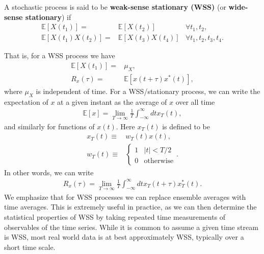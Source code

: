 A stochastic process is said to be \textbf{weak-sense stationary (WSS)} (or \textbf{wide-sense stationary}) if 
\begin{align}
    \mathbb{E}\left[X\left(t_1\right)\right]
    =&
    \mathbb{E}\left[X\left(t_2\right)\right]
    &
    \forall t_1,t_2
    ,\\
    \mathbb{E}\left[X\left(t_1\right)X\left(t_2\right)\right]
    =&
    \mathbb{E}\left[X\left(t_3\right)X\left(t_4\right)\right]
    &
    \forall t_1,t_2, t_3, t_4
    .
\end{align}

That is, for a WSS process we have
\begin{align}
    \label{eq:WSS-mean}
    \mathbb{E}\left[X\left(t_1\right)\right]
    =&
    \mu_X
    ,\\
    \label{eq:WSS-autocorrelation}
    R_x\left(\tau\right) 
    =&
    \mathbb{E}\left[x\left(t+\tau\right)x^*\left(t\right)\right]
    ,
\end{align}
where $\mu_X$ is independent of time.
For a WSS/stationary process, we can write the expectation of $x$ at a given instant as the average of $x$ over all time 
\begin{align}
    \mathbb{E}\left[x\right]
    =
    \lim_{T\to\infty}\frac{1}{T}\int_{-\infty}^{\infty}dt x_T\left(t\right)
    ,
\end{align}
and similarly for functions of $x(t)$.
Here $x_T\left(t\right)$ is defined to be
\begin{align}
    x_T\left(t\right) 
    \equiv& 
    w_T\left(t\right)x\left(t\right)
    ,\\
    w_T\left(t\right)
    \equiv&
    \begin{cases}
        1 & |t|<T/2
        \\
        0 & \mathrm{otherwise}
    \end{cases}
    .
\end{align}
In other words, we can write
\begin{align}
    \label{eq:autocorrelation-WSS-integral}
    R_x\left(\tau\right)
    =
    \lim_{T\to\infty}\frac{1}{T}\int_{-\infty}^{\infty}dt 
        x_T\left(t+\tau\right)x_T^*\left(t\right)
    .
\end{align}
We emphasize that for WSS processes we can replace ensemble averages with time averages.
This is extremely useful in practice, as we can then determine the statistical properties
of WSS by taking repeated time measurements of observables of the time series.
While it is common to assume a given time stream is WSS, 
most real world data is at best approximately WSS, typically over a short time scale.

